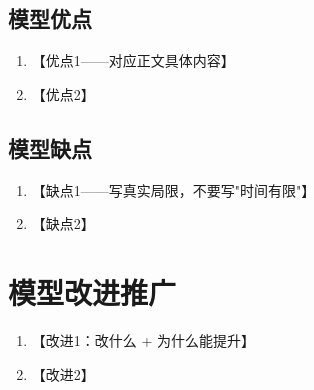 \subsection{模型优点}
\begin{enumerate}
  \item 【优点1——对应正文具体内容】
  \item 【优点2】
\end{enumerate}
\subsection{模型缺点}
\begin{enumerate}
  \item 【缺点1——写真实局限，不要写"时间有限"】
  \item 【缺点2】
\end{enumerate}

\section{模型改进推广}
\begin{enumerate}
  \item 【改进1：改什么 + 为什么能提升】
  \item 【改进2】
\end{enumerate}

